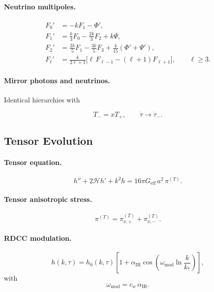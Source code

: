 \documentclass[11pt,a4paper]{article}
\begin{document}
\paragraph{Neutrino multipoles.}
\begin{align}
    F_{0}' &= -kF_{1} - \Phi', \\
    F_{1}' &= \frac{k}{3}F_{0} - \frac{2k}{3}F_{2} + k\Psi, \\
    F_{2}' &= \frac{2k}{5}F_{1} - \frac{3k}{5}F_{3}
             + \frac{4}{15}(\Phi' + \Psi'), \\
    F_{\ell}' &= \frac{k}{2\ell+1}\bigl[\ell\,F_{\ell-1}
               - (\ell+1)F_{\ell+1}\bigr], \qquad \ell \ge 3.
\end{align}

\paragraph{Mirror photons and neutrinos.}
Identical hierarchies with


\[
    T_{-} = xT_{+}, \qquad
    \dot{\tau} \rightarrow \dot{\tau}_{-}.
\]



\subsection{Tensor Evolution}

\paragraph{Tensor equation.}
\begin{equation}
    h'' + 2\mathcal{H}h' + k^{2}h
    = 16\pi G_{\mathrm{eff}}\,a^{2}\,\pi^{(T)}.
\end{equation}

\paragraph{Tensor anisotropic stress.}
\begin{equation}
    \pi^{(T)} = \pi^{(T)}_{\nu,+} + \pi^{(T)}_{\nu,-}.
\end{equation}

\paragraph{RDCC modulation.}
\begin{equation}
    h(k,\tau)
    = h_{0}(k,\tau)\left[1 + \alpha_{\mathrm{IR}}
      \cos\!\left(\omega_{\mathrm{mod}}\ln\frac{k}{k_{\ast}}\right)\right],
\end{equation}
with
\begin{equation}
    \omega_{\mathrm{mod}} = c_{w}\,\alpha_{\mathrm{IR}}.
\end{equation}
\end{document}
